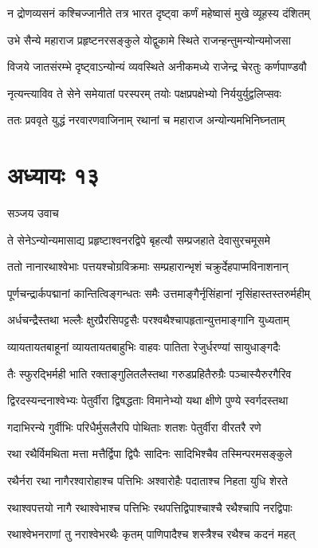 \twolineshloka
{न द्रोणव्यसनं कश्चिज्जानीते तत्र भारत}
{दृष्ट्वा कर्णं महेष्वासं मुखे व्यूहस्य दंशितम्}


\twolineshloka
{उभे सैन्ये महाराज प्रहृष्टनरसङ्कुले}
{योद्वुकामे स्थिते राजन्हन्तुमन्योन्यमोजसा}


\twolineshloka
{विजये जातसंरम्भे दृष्ट्वाऽन्योन्यं व्यवस्थिते}
{अनीकमध्ये राजेन्द्र चेरतुः कर्णपाण्डवौ}


\twolineshloka
{नृत्यन्त्याविव ते सेने समेयातां परस्परम्}
{तयोः पक्षप्रपक्षेभ्यो निर्ययुर्युद्वलिप्सवः}


\twolineshloka
{ततः प्रववृते युद्धं नरवारणवाजिनाम्}
{रथानां च महाराज अन्योन्यमभिनिघ्नताम्}


\chapter{अध्यायः १३}
\twolineshloka
{सञ्जय उवाच}
{}


\twolineshloka
{ते सेनेऽन्योन्यमासाद्य प्रहृष्टाश्वनरद्विपे}
{बृहत्यौ सम्प्रजहाते देवासुरचमूसमे}


\twolineshloka
{ततो नानारथाश्वेभाः पत्तयश्चोग्रविक्रमाः}
{सम्प्रहारान्भृशं चक्रुर्देहपाप्मविनाशनान्}


\twolineshloka
{पूर्णचन्द्रार्कपद्मानां कान्तित्विङ्गन्धतः समैः}
{उत्तमाङ्गैर्नृसिंहानां नृसिंहास्तस्तरुर्महीम्}


\twolineshloka
{अर्धचन्द्रैस्तथा भल्लैः क्षुरप्रैरसिपट्टसैः}
{परश्वथैश्चापहृतान्युत्तमाङ्गानि युध्यताम्}


\twolineshloka
{व्यायतायतबाहूनां व्यायतायतबाहुभिः}
{वाहवः पातिता रेजुर्धरण्यां सायुधाङ्गदैः}


\twolineshloka
{तैः स्फुरद्भिर्मही भाति रक्ताङ्गुलितलैस्तथा}
{गरुडप्रहितैरुग्रैः पञ्चास्यैरुरगैरिव}


\twolineshloka
{द्विरदस्यन्दनाश्वेभ्यः पेतुर्वीरा द्विषद्धताः}
{विमानेभ्यो यथा क्षीणे पुण्ये स्वर्गदस्तथा}


\twolineshloka
{गदाभिरन्ये गुर्वीभिः परिधैर्मुसलैरपि}
{पोथिताः शतशः पेतुर्वीरा वीरतरै रणे}


\twolineshloka
{रथा रथैर्विमथिता मत्ता मत्तैर्द्विपा द्विपैः}
{सादिनः सादिभिश्चैव तस्मिन्परमसङ्कुले}


\twolineshloka
{रथैर्नरा रथा नागैरश्वारोहाश्च पत्तिभिः}
{अश्वारोहैः पदाताश्च निहता युधि शेरते}


\twolineshloka
{रथाश्वपत्तयो नागै रथाश्वेभाश्च पत्तिभिः}
{रथपत्तिद्विपाश्चाश्चै रथैश्चापि नरद्विपाः}


\twolineshloka
{रथाश्वेभनराणां तु नराश्वेभरथैः कृतम्}
{पाणिपादैश्च शस्त्रैश्च रथैश्च कदनं महत्}


